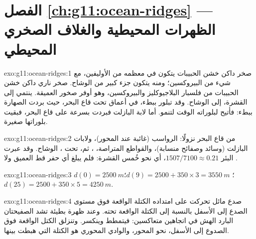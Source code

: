 \section*{الفصل \ref{ch:g11:ocean-ridges} --- الظهرات المحيطية والغلاف الصخري المحيطي}

\begin{solution}{exo:g11:ocean-ridges:1}
 صخر داكن خشن الحبيبات يتكون في معظمه من الأوليفين، مع شيء من
البيروكسين؛ ومنه يتكون جزء كبير من الوشاح.  صخر ناري داكن خشن الحبيبات
من فلسبار البلاجيوكليز والبيروكسين، وهو أوفر صخور
 العميقة.  ينتمي إلى القشرة،  إلى الوشاح.
وقد تبلور  ببطء، في أعماق تحت قاع البحر، حيث بردت الصهارة
ببطء: فأتيح لبلوراته الوقت لتنمو. أما لابة البازلت فبردت بسرعة على قاع
البحر، فبقيت بلوراتها صغيرة.
\end{solution}

\begin{solution}{exo:g11:ocean-ridges:2}
من قاع البحر نزولًا: الرواسب (غائبة عند المحور)، ولابات البازلت (وسائد
وصفائح منسابة)، والقواطع المتراصة، ، ثم، تحت ، 
الوشاح. وقد عبرت البئر $1507/7100 \approx 0.21$، أي نحو خُمس
القشرة: فلم يبلغ أي حفر قط  العميق ولا .
\end{solution}

\begin{solution}{exo:g11:ocean-ridges:3}
$d(0) = \qty{2500}{m}$؛ $d(9) = 2500 + 350 \times 3 = \qty{3550}{m}$؛
$d(25) = 2500 + 350 \times 5 = \qty{4250}{m}$.
\end{solution}

\begin{solution}{exo:g11:ocean-ridges:4}
 صدع مائل تحركت على امتداده الكتلة الواقعة فوق مستوى
الصدع إلى الأسفل بالنسبة إلى الكتلة الواقعة تحته. وعند ظهرة بطيئة تشد الصفيحتان
 البارد الهش في اتجاهين متعاكسين: فيتمطط وينكسر. وتنزلق
الكتل الواقعة فوق الصدوع إلى الأسفل، نحو المحور، والوادي المحوري هو
الكتلة التي هبطت بينها.
\end{solution}

